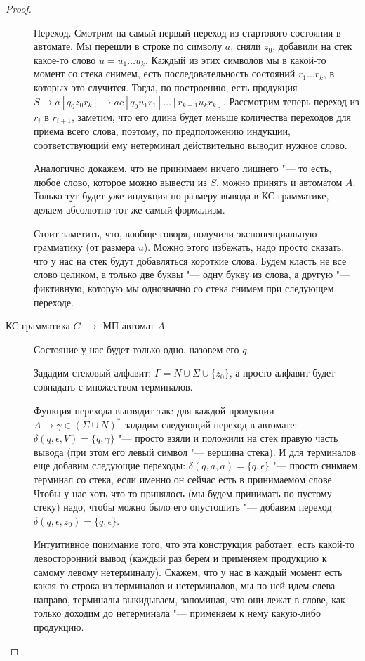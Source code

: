 \begin{proof}
\begin{description}
    Переход. Смотрим на самый первый переход из стартового состояния в автомате. 
    Мы перешли в строке по символу $a$, сняли $z_0$, добавили на стек какое-то слово $u=u_1\dots u_k$.
    Каждый из этих символов мы в какой-то момент со стека снимем, есть последовательность состояний $r_1 \dots r_k$, в которых это случится. 
    Тогда, по построению, есть продукция $S \to a [q_0 z_0 r_k] \to a c [q_0 u_1 r_1] \dots [r_{k-1} u_k r_k]$. 
    Рассмотрим теперь переход из $r_i$ в $r_{i+1}$, заметим, что его длина будет меньше количества переходов для приема всего слова, поэтому, по предположению индукции, 
    соответствующий ему нетерминал действительно выводит нужное слово.

    Аналогично докажем, что не принимаем ничего лишнего "--- то есть, любое слово, которое можно вывести из $S$, можно принять и автоматом $A$. 
    Только тут будет уже индукция по размеру вывода в КС-грамматике, делаем абсолютно тот же самый формализм.

    Стоит заметить, что, вообще говоря, получили экспоненциальную грамматику (от размера $u$). 
    Можно этого избежать, надо просто сказать, что у нас на стек будут добавляться короткие слова. 
    Будем класть не все слово целиком, а только две буквы "--- одну букву из слова, а другую "--- фиктивную, которую мы однозначно со стека снимем при следующем переходе.

    \item[КС-грамматика $G$ $\to$ МП-автомат $A$]
    Состояние у нас будет только одно, назовем его $q$.

    Зададим стековый алфавит: $\Gamma = N \cup \Sigma \cup \{z_0\}$, а просто алфавит будет совпадать с множеством терминалов.

    Функция перехода выглядит так: для каждой продукции $A \to \gamma \in (\Sigma \cup N)^*$ зададим следующий переход в автомате: $\delta(q, \epsilon, V) = \{q, \gamma\}$ "---
    просто взяли и положили на стек правую часть вывода (при этом его левый символ "--- вершина стека).
    И для терминалов еще добавим следующие переходы: $\delta(q, a, a) = \{q, \epsilon\}$ "--- просто снимаем терминал со стека, если именно он сейчас есть в принимаемом слове.
    Чтобы у нас хоть что-то принялось (мы будем принимать по пустому стеку) надо, чтобы можно было его опустошить "--- добавим переход $\delta(q, \epsilon, z_0) = \{q, \epsilon\}$.

    Интуитивное понимание того, что эта конструкция работает: есть какой-то левосторонний вывод (каждый раз берем и применяем продукцию к самому левому нетерминалу). 
    Скажем, что у нас в каждый момент есть какая-то строка из терминалов и нетерминалов, мы по ней идем слева направо, терминалы выкидываем, запоминая, что они лежат в слове, 
    как только доходим до нетерминала "--- применяем к нему какую-либо продукцию. 


\end{description}
\end{proof}
